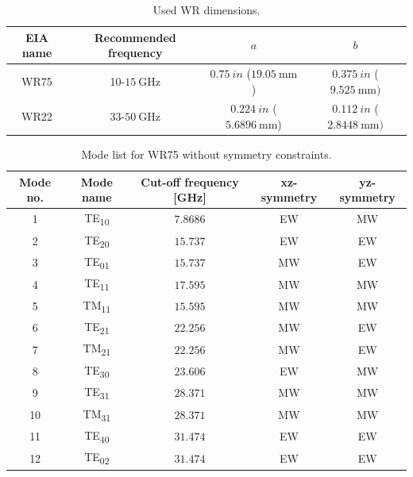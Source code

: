 \documentclass[english,twoside]{article}
\begin{document}
      \begin{table}[H]
        \centering
        \caption{Used WR dimensions.}
        \begin{tabular}{c|c|c|c}
          \ac{EIA} name & Recommended frequency &  $a$  & $b$ \\
          \hline
          WR75 & 10-$\SI{15}{\giga\hertz}$ &  $\SI{0.75}{in}$ ($\SI{19.05}{\milli\metre}$) & $\SI{0.375}{in}$ ($\SI{9.525}{\milli\metre})$\\
          WR22 & 33-$\SI{50}{\giga\hertz}$ &  $\SI{0.224}{in}$ ($\SI{5.6896}{\milli\metre}$) & $\SI{0.112}{in}$ ($\SI{2.8448}{\milli\metre})$
        \end{tabular}
        \label{table:wr_dimensions}
      \end{table}
      
      \begin{table}[H]
        \centering
        \caption{Mode list for WR75 without symmetry constraints.}
        \begin{tabular}{c|c|c|c|c}
          Mode no. & Mode name & Cut-off frequency [GHz] & xz-symmetry & yz-symmetry\\
          \hline
          1 & TE\textsubscript{10} & $\num{7.8686}$ & EW & MW\\
          2 & TE\textsubscript{20} & $\num{15.737}$ & EW & EW\\
          3 & TE\textsubscript{01} & $\num{15.737}$ & MW & EW\\
          4 & TE\textsubscript{11} & $\num{17.595}$ & MW & MW\\
          5 & TM\textsubscript{11} & $\num{15.595}$ & MW & MW\\
          6 & TE\textsubscript{21} & $\num{22.256}$ & MW & EW\\
          7 & TM\textsubscript{21} & $\num{22.256}$ & MW & EW\\
          8 & TE\textsubscript{30} & $\num{23.606}$ & EW & MW\\
          9 & TE\textsubscript{31} & $\num{28.371}$ & MW & MW\\
          10 & TM\textsubscript{31} & $\num{28.371}$ & MW & MW\\
          11 & TE\textsubscript{40} & $\num{31.474}$ & EW & EW\\
          12 & TE\textsubscript{02} & $\num{31.474}$ & EW & EW
        \end{tabular}
        \label{table:wr75_modes}
      \end{table}
      
\end{document}
